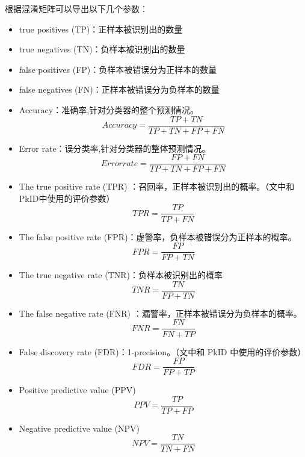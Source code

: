根据混淆矩阵可以导出以下几个参数：
\begin{itemize}
    \item true positives (TP)：正样本被识别出的数量
    \item true negatives (TN)：负样本被识别出的数量
    \item false positives (FP)：负样本被错误分为正样本的数量
    \item false negatives (FN)：正样本被错误分为负样本的数量 
    \item Accuracy：准确率,针对分类器的整个预测情况。
        \begin{displaymath}
            Accuracy=\frac{TP+TN}{TP+TN+FP+FN}
        \end{displaymath}
    \item {Error rate：误分类率,针对分类器的整体预测情况。}
        \begin{displaymath}
            Error rate=\frac{FP+FN}{TP+TN+FP+FN}
        \end{displaymath}
    \item {The true positive rate (TPR) ：召回率，正样本被识别出的概率。}（文中和PkID中使用的评价参数）
        \begin{displaymath}
            TPR=\frac{TP}{TP+FN}
        \end{displaymath}
     \item The false positive rate (FPR)：虚警率，负样本被错误分为正样本的概率。
        \begin{displaymath}
            FPR=\frac{FP}{FP+TN}
        \end{displaymath}
    \item The true negative rate (TNR)：负样本被识别出的概率
        \begin{displaymath}
            TNR=\frac{TN}{FP+TN}
        \end{displaymath}

    \item The false negative rate (FNR) ：漏警率，正样本被错误分为负样本的概率。
        \begin{displaymath}
            FNR=\frac{FN}{FN+TP}
        \end{displaymath}
    \item {False discovery rate (FDR)：1-precision。}（文中和 PkID 中使用的评价参数）
        \begin{displaymath}
            FDR=\frac{FP}{FP+TP}
        \end{displaymath}
    \item Positive predictive value (PPV)
        \begin{displaymath}
            PPV=\frac{TP}{TP+FP}
        \end{displaymath}
    \item Negative predictive value (NPV)
        \begin{displaymath}
            NPV=\frac{TN}{TN+FN}
        \end{displaymath}
    
\end{itemize}

